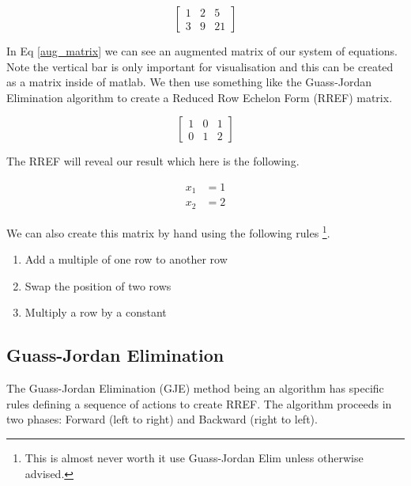 \documentclass[12pt]{article}
\begin{document}
					\begin{equation} \label{aug_matrix}
						\left[
						\begin{array}{cc|c}
							1 & 2 & 5 \\
							3 & 9 & 21
						\end{array}
						\right]
					\end{equation}

					In Eq \eqref{aug_matrix} we can see an augmented matrix of our system of equations.
					Note the vertical bar is only important for visualisation and this can be created as a matrix inside of matlab.
					We then use something like the Guass-Jordan Elimination algorithm to create a Reduced Row Echelon Form (RREF) matrix.

					\[ \label{aug_matrix}
						\left[
						\begin{array}{cc|c}
							1 & 0 & 1 \\
							0 & 1 & 2
						\end{array}
						\right]
					\]

					The RREF will reveal our result which here is the following.

					\begin{align*}
						x_1 &= 1\\
						x_2 &= 2
					\end{align*}

					We can also create this matrix by hand using the following rules \cite{savov}\footnote{
						This is almost never worth it use Guass-Jordan Elim unless otherwise advised.}.

					\begin{enumerate}
						\item Add a multiple of one row to another row
						\item Swap the position of two rows
						\item Multiply a row by a constant
					\end{enumerate}
				
				\subsection{Guass-Jordan Elimination}
					The Guass-Jordan Elimination (GJE) method being an algorithm has specific rules defining a sequence of actions to create RREF.
					The algorithm proceeds in two phases: Forward (left to right) and Backward (right to left).
\end{document}
